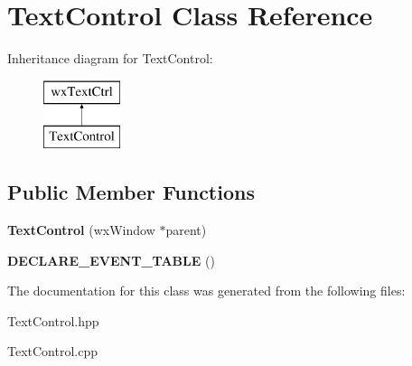 \hypertarget{class_text_control}{}\section{Text\+Control Class Reference}
\label{class_text_control}
Inheritance diagram for Text\+Control\+:\begin{figure}[H]
\begin{center}
\leavevmode
\includegraphics[height=2.000000cm]{class_text_control}
\end{center}
\end{figure}
\subsection*{Public Member Functions}
\begin{DoxyCompactItemize}
\item 
\mbox{\label{class_text_control_ae9c393c9539be543563dab9bf19548e3}} 
{\bfseries Text\+Control} (wx\+Window $\ast$parent)
\item 
\mbox{\label{class_text_control_ad8486a4d0639876fdaee57e8a7033d12}} 
{\bfseries D\+E\+C\+L\+A\+R\+E\+\_\+\+E\+V\+E\+N\+T\+\_\+\+T\+A\+B\+LE} ()
\end{DoxyCompactItemize}


The documentation for this class was generated from the following files\+:\begin{DoxyCompactItemize}
\item 
Text\+Control.\+hpp\item 
Text\+Control.\+cpp\end{DoxyCompactItemize}
